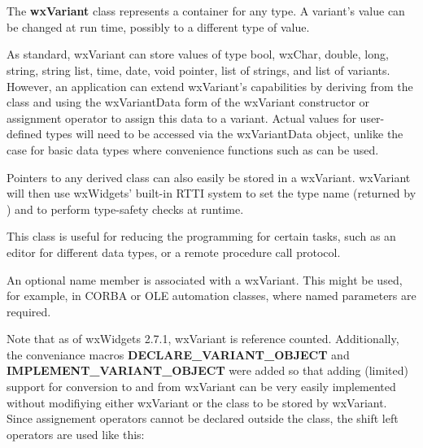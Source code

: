 
\section{}\label{wxvariant}

The {\bf wxVariant} class represents a container for any type.
A variant's value can be changed at run time, possibly to a different type of value.

As standard, wxVariant can store values of type bool, wxChar, double, long, string,
string list, time, date, void pointer, list of strings, and list of variants. 
However, an application can extend wxVariant's capabilities by deriving from the
class  and using the wxVariantData form of
the wxVariant constructor or assignment operator to assign this data to a variant.
Actual values for user-defined types will need to be accessed via the wxVariantData
object, unlike the case for basic data types where convenience functions such as
 can be used.

Pointers to any  derived class can also easily be stored
in a wxVariant. wxVariant will then use wxWidgets' built-in RTTI system to set the
type name (returned by ) and to perform 
type-safety checks at runtime.

This class is useful for reducing the programming for certain tasks, such as an editor
for different data types, or a remote procedure call protocol.

An optional name member is associated with a wxVariant. This might be used, for example,
in CORBA or OLE automation classes, where named parameters are required.

Note that as of wxWidgets 2.7.1, wxVariant is reference counted. Additionally, the
conveniance macros {\bf DECLARE\_VARIANT\_OBJECT} and {\bf IMPLEMENT\_VARIANT\_OBJECT}
were added so that adding (limited) support for conversion to and from wxVariant
can be very easily implemented without modifiying either wxVariant or the class
to be stored by wxVariant. Since assignement operators cannot be declared outside
the class, the shift left operators are used like this:

